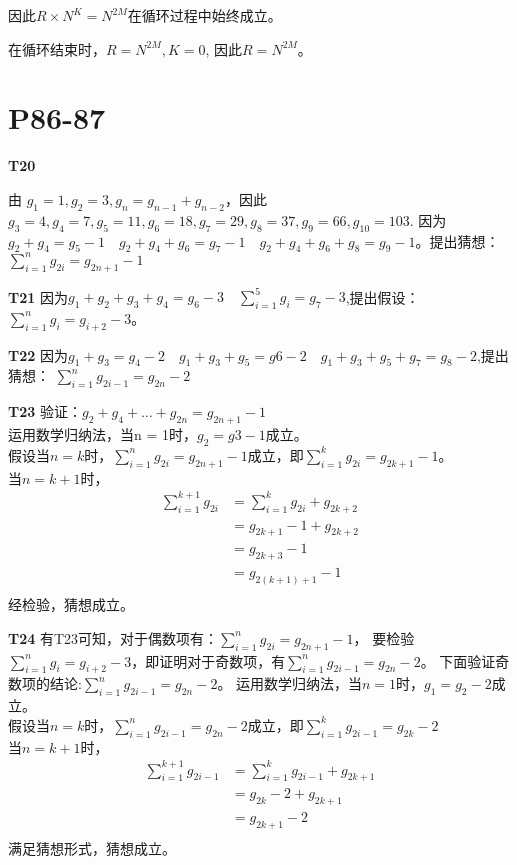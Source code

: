 \documentclass{article}
\begin{document}
因此$R \times N^K = N^{2M}$在循环过程中始终成立。

在循环结束时，$R = N^{2M}, K = 0$, 因此$R = N^{2M}$。

\section{P86-87}

\textbf{T20}

由 $g_1 = 1, g_2 = 3, g_n = g_{n - 1} + g_{n - 2}$，因此$g_3 = 4, g_4 = 7, g_5 = 11, g_6 = 18, g_7 = 29, g_8 = 37, g_9 = 66, g_{10} = 103$.
因为$g_2 + g_4 = g_5 - 1 \quad g_2 + g_4 + g_6 = g_7 - 1 \quad g_2 + g_4 +g_6 + g_8 = g_9 - 1$。提出猜想：$\sum_{i = 1}^{n}g_{2i} = g_{2n + 1} - 1$

\vspace{10pt}

\textbf{T21}
因为$g_1 + g_2 + g_3 + g_4 = g_6 - 3 \quad \sum_{i = 1}^{5}g_i = g_7 - 3$,提出假设：$\sum_{i = 1}^{n}g_i = g_{i + 2} - 3$。

\vspace{10pt}

\textbf{T22}
因为$g_1 + g_3 = g_4 - 2\quad g_1 + g_3 + g_5 = g6 - 2 \quad g_1 + g_3 + g_5 + g_7 = g_8 - 2$,提出猜想：
$\sum_{i = 1}^{n}g_{2i - 1} = g_{2n} - 2$

\vspace{10pt}

\textbf{T23}
验证：$g_2 + g_4 + \dots + g_{2n} = g_{2n + 1} - 1$\\
运用数学归纳法，当n = 1时，$g_2 = g3 - 1$成立。\\
假设当$n = k$时，$\sum_{i = 1}^{n}g_{2i} = g_{2n + 1} - 1$成立，即$\sum_{i = 1}^{k}g_{2i} = g_{2k + 1} - 1$。\\
当$n = k + 1$时，
\begin{align*}
    \sum_{i = 1}^{k + 1}g_{2i} &= \sum_{i = 1}^{k}g_{2i} + g_{2k + 2}\\
    &= g_{2k + 1} - 1 + g_{2k + 2}\\
    &= g_{2k + 3} - 1\\
    &= g_{2(k + 1) + 1} - 1\\
\end{align*}
经检验，猜想成立。

\vspace{10pt}

\textbf{T24}
有T23可知，对于偶数项有：$\sum_{i = 1}^{n}g_{2i} = g_{2n + 1} - 1$，
要检验$\sum_{i = 1}^{n}g_i = g_{i + 2} - 3$，即证明对于奇数项，有$\sum_{i = 1}^{n}g_{2i - 1} = g_{2n} - 2$。
下面验证奇数项的结论:$\sum_{i = 1}^{n}g_{2i - 1} = g_{2n} - 2$。
运用数学归纳法，当$n = 1$时，$g_1 = g_2 - 2$成立。\\
假设当$n = k$时，$\sum_{i = 1}^{n}g_{2i - 1} = g_{2n} - 2$成立，即$\sum_{i = 1}^{k}g_{2i - 1} = g_{2k} - 2$\\
当$n = k + 1$时，
\begin{align*}
    \sum_{i = 1}^{k + 1}g_{2i - 1} &= \sum_{i = 1}^{k}g_{2i - 1} + g_{2k + 1}\\
    &= g_{2k} - 2 + g_{2k + 1}\\
    &= g_{2k + 1} - 2\\
\end{align*}
满足猜想形式，猜想成立。
\end{document}
